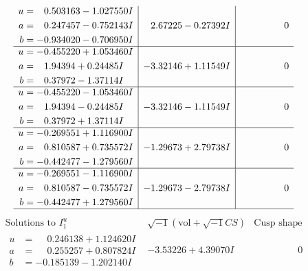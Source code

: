 \documentclass[1p]{elsarticle_modified}
\theoremstyle{definition}
\newcommand{\I}{\sqrt{-1}}
\begin{document}
$$\begin{array}{c|c|c}
\begin{aligned}
u &= \phantom{-}0.503163 - 1.027550 I \\
a &= \phantom{-}0.247457 - 0.752143 I \\
b &= -0.934020 - 0.706950 I\end{aligned}
 & \phantom{-}2.67225 - 0.27392 I & \phantom{-0.000000 } 0 \\ \hline\begin{aligned}
u &= -0.455220 + 1.053460 I \\
a &= \phantom{-}1.94394 + 0.24485 I \\
b &= \phantom{-}0.37972 - 1.37114 I\end{aligned}
 & -3.32146 + 1.11549 I & \phantom{-0.000000 } 0 \\ \hline\begin{aligned}
u &= -0.455220 - 1.053460 I \\
a &= \phantom{-}1.94394 - 0.24485 I \\
b &= \phantom{-}0.37972 + 1.37114 I\end{aligned}
 & -3.32146 - 1.11549 I & \phantom{-0.000000 } 0 \\ \hline\begin{aligned}
u &= -0.269551 + 1.116900 I \\
a &= \phantom{-}0.810587 + 0.735572 I \\
b &= -0.442477 - 1.279560 I\end{aligned}
 & -1.29673 + 2.79738 I & \phantom{-0.000000 } 0 \\ \hline\begin{aligned}
u &= -0.269551 - 1.116900 I \\
a &= \phantom{-}0.810587 - 0.735572 I \\
b &= -0.442477 + 1.279560 I\end{aligned}
 & -1.29673 - 2.79738 I & \phantom{-0.000000 } 0\\
 \hline 
 \end{array}$$\newpage$$\begin{array}{c|c|c}  
\text{Solutions to }I^u_{1}& \I (\text{vol} + \sqrt{-1}CS) & \text{Cusp shape}\\
 \hline 
\begin{aligned}
u &= \phantom{-}0.246138 + 1.124620 I \\
a &= \phantom{-}0.255257 + 0.807824 I \\
b &= -0.185139 - 1.202140 I\end{aligned}
 & -3.53226 + 4.39070 I & \phantom{-0.000000 } 0 \\ \hline\begin{aligned}

\end{aligned}
\end{array}$$
\end{document}
